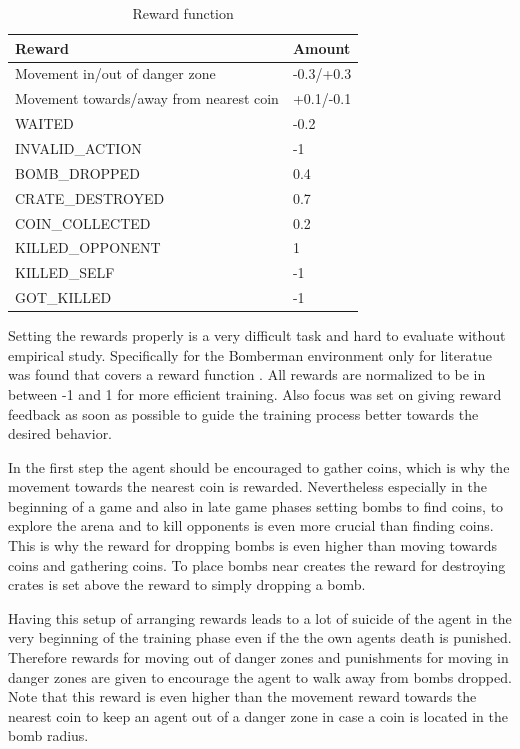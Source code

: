 \begin{table}[hbt!]
	\caption{Reward function}
	\label{tab:rewards}
	\begin{tabular}{|p{}|p{}|}
		\hline
		\textbf{Reward} & \textbf{Amount} \\ \hline
		Movement in/out of danger zone & -0.3/+0.3 \\ \hline
		Movement towards/away from nearest coin & +0.1/-0.1 \\ \hline
		WAITED & -0.2 \\ \hline
		INVALID\_ACTION & -1 \\ \hline
		BOMB\_DROPPED & 0.4 \\ \hline
		CRATE\_DESTROYED & 0.7 \\ \hline
		COIN\_COLLECTED & 0.2 \\ \hline
		KILLED\_OPPONENT & 1 \\ \hline
		KILLED\_SELF & -1 \\ \hline
		GOT\_KILLED & -1 \\ \hline
	\end{tabular}
\end{table}

Setting the rewards properly is a very difficult task and hard to evaluate without empirical study. Specifically for the Bomberman environment only for literatue was found that covers a reward function \cite{Kormelink2018, Franca2019}. All rewards are normalized to be in between -1 and 1 for more efficient training. Also focus was set on giving reward feedback as soon as possible to guide the training process better towards the desired behavior. 


In the first step the agent should be encouraged to gather coins, which is why the movement towards the nearest coin is rewarded. Nevertheless especially in the beginning of a game and also in late game phases setting bombs to find coins, to explore the arena and to kill opponents is even more crucial than finding coins. This is why the reward for dropping bombs is even higher than moving towards coins and gathering coins. To place bombs near creates the reward for destroying crates is set above the reward to simply dropping a bomb. 

Having this setup of arranging rewards leads to a lot of suicide of the agent in the very beginning of the training phase even if the the own agents death is punished. Therefore rewards for moving out of danger zones and punishments for moving in danger zones are given to encourage the agent to walk away from bombs dropped. Note that this reward is even higher than the movement reward towards the nearest coin to keep an agent out of a danger zone in case a coin is located in the bomb radius. 

